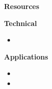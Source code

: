 \begin{frame}\begin{center}
		\LARGE\textbf{Resources}
\end{center}\end{frame}

\begin{frame}[allowframebreaks]\textbf{Technical}\vspace{0.3cm}

\begin{itemize}\small
\item {}
\end{itemize}

\end{frame}
\begin{frame}[allowframebreaks]\textbf{Applications}\vspace{0.3cm}

\begin{itemize}\small
\item {}
\item {}
\end{itemize}

\end{frame}
